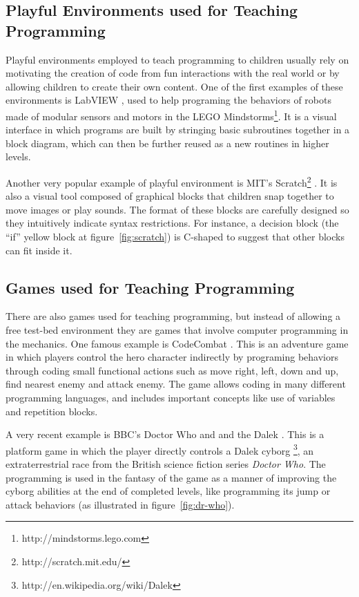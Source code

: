 \documentclass{sigchi}
\begin{document}
    \subsection{Playful Environments used for Teaching Programming}
        Playful environments employed to teach programming to children usually
        rely on motivating the creation of code from fun interactions with the
        real world or by allowing children to create their own content. One of
        the first examples of these environments is LabVIEW \cite{Erwin2000},
        used to help programing the behaviors of robots made of modular sensors
        and motors in the LEGO Mindstorms\footnote{http://mindstorms.lego.com}.
        It is a visual interface in which programs are built by stringing basic
        subroutines together in a block diagram, which can then be further
        reused as a new routines in higher levels.

        Another very popular example of playful environment is MIT's
        Scratch\footnote{http://scratch.mit.edu/} \cite{Resnick2009}. It is also
        a visual tool composed of graphical blocks that children snap together
        to move images or play sounds. The format of these blocks are carefully
        designed so they intuitively indicate syntax restrictions. For instance,
        a decision block (the ``if'' yellow block at figure~\ref{fig:scratch})
        is C-shaped to suggest that other blocks can fit inside it.

    \subsection{Games used for Teaching Programming}
        There are also games used for teaching programming, but instead of
        allowing a free test-bed environment they are games that involve
        computer programming in the mechanics. One famous example is CodeCombat
        \cite{Saines2013}. This is an adventure game in which players control
        the hero character indirectly by programing behaviors through coding
        small functional actions such as move right, left, down and up, find
        nearest enemy and attack enemy. The game allows coding in many different
        programming languages, and includes important concepts like use of
        variables and repetition blocks.

        A very recent example is BBC's Doctor Who and and the Dalek
        \cite{BBC2014}. This is a platform game in which the player directly
        controls a Dalek cyborg \footnote{http://en.wikipedia.org/wiki/Dalek},
        an extraterrestrial race from the British science fiction series
        \textit{Doctor Who}. The programming is used in the fantasy of the game
        as a manner of improving the cyborg abilities at the end of completed
        levels, like programming its jump or attack behaviors (as illustrated
        in figure~\ref{fig:dr-who}).
\end{document}
